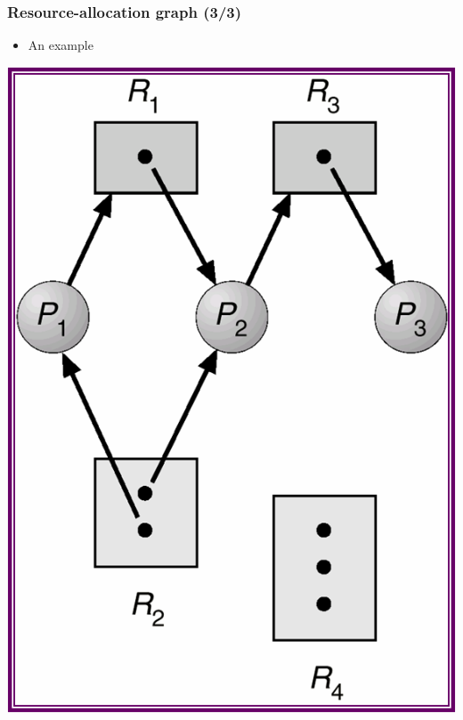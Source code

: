 \documentclass[CJKutf8,xcolor=pdftex,dvipsnames,table]{beamer}
\begin{document}
\begin{CJK*}{UTF8}{song}
  \begin{frame}
  \frametitle{Resource-allocation graph (3/3)} \pause
  \begin{itemize}
  \item{An example} \pause
  \end{itemize}
  \begin{center}
    \includegraphics[scale=0.5]{v6f8-1}
  \end{center}
  \end{frame}


\end{CJK*}
\end{document}
